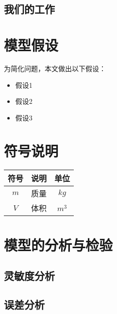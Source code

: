 \documentclass[withoutpreface,bwprint]{cumcmthesis}
\begin{document}

\subsection{我们的工作}


\section{模型假设}

为简化问题，本文做出以下假设：

\begin{itemize}[itemindent=2em]
\item 假设1
\item 假设2
\item 假设3
\end{itemize}


\section{符号说明}
\begin{table}[H]
\centering
\begin{tabularx}{\textwidth}{CLC}
\toprule
符号    & 说明    & 单位 \\
\midrule
$m     $& 质量 & $kg$ \\
$V     $& 体积 & $m^3$ \\
\bottomrule
\end{tabularx}
\label{tab:符号说明}
\end{table}







\section{模型的分析与检验}

\subsection{灵敏度分析}

\subsection{误差分析}
\end{document}
